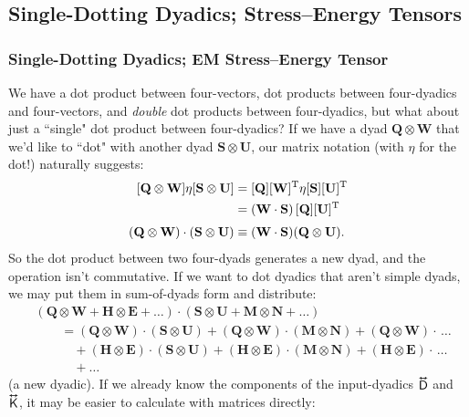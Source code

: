 \documentclass[12pt]{article}
\renewcommand{\vv}[1]{\mathbf{#1}}
\newcommand{\tightoverset}[2]{%
  \mathop{#2}\limits^{\vbox to -.5ex{\kern-0.75ex\hbox{$#1$}\vss}}}
\newcommand{\inlinedy}[1]{\tightoverset{\text{\tiny$\bm\leftrightarrow$}}{#1}}
\begin{document}
\subsection{Single-Dotting Dyadics; Stress--Energy Tensors}

\subsubsection{Single-Dotting Dyadics; EM Stress--Energy Tensor}\label{sssec:sdfd}

We have a dot product between four-vectors, dot products between four-dyadics and four-vectors, and \emph{double} dot products between four-dyadics, but what about just a ``single" dot product between four-dyadics? If we have a dyad $\vv Q \otimes \vv W$ that we'd like to ``dot" with another dyad $\vv S \otimes \vv U$, our matrix notation (with $\eta$ for the dot!) naturally suggests:
\begin{equation*}
\begin{aligned}
\mkern0mu [ \vv Q \otimes \vv W ] \eta [ \vv S \otimes \vv U ] &= [\vv Q][\vv W]^{\mathrm{T}} \eta [\vv S][\vv U]^{\mathrm{T}} \\
&= (\vv W \cdot \vv S) \, [\vv Q] [\vv U]^{\mathrm{T}} \\[3pt]
(\vv Q \otimes \vv W) \cdot (\vv S \otimes \vv U) & \equiv (\vv W \cdot \vv S) (\vv Q \otimes \vv U) .
\end{aligned}
\end{equation*}
So the dot product between two four-dyads generates a new dyad, and the operation isn't commutative. If we want to dot dyadics that aren't simple dyads, we may put them in sum-of-dyads form and distribute:
\begin{equation*}
\begin{aligned}
&(\vv Q \otimes \vv W + \vv H \otimes \vv E + \dots ) \cdot (\vv S \otimes \vv U + \vv M \otimes \vv N + \dots ) \\[3pt]
&\qquad = (\vv Q \otimes \vv W) \cdot (\vv S \otimes \vv U) + (\vv Q \otimes \vv W) \cdot (\vv M \otimes \vv N) + (\vv Q \otimes \vv W) \cdot \, \dots \\
& \qquad \quad + (\vv H \otimes \vv E) \cdot (\vv S \otimes \vv U) + (\vv H \otimes \vv E) \cdot (\vv M \otimes \vv N) + (\vv H \otimes \vv E) \cdot \, \dots \\
& \qquad \quad + \dots
\end{aligned}
\end{equation*}
(a new dyadic). If we already know the components of the input-dyadics $\inlinedy{\mathsf{D}}$ and $\inlinedy{\mathsf{K}}$, it may be easier to calculate with matrices directly:
\end{document}
